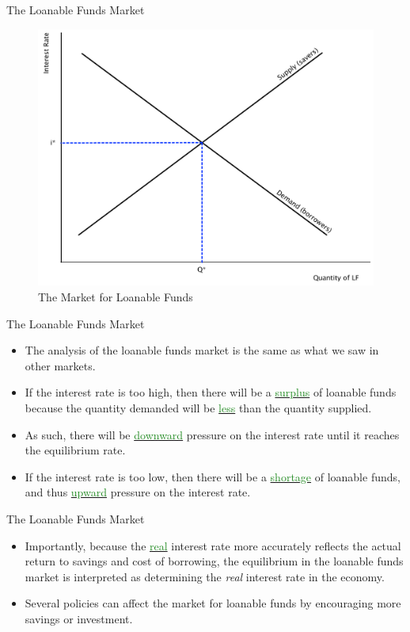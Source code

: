 \documentclass[xcolor={dvipsnames},pdf, hyperref={colorlinks=true, citecolor=ForestGreen, linkcolor=BlueViolet, urlcolor=Magenta}]{beamer}
\theoremstyle{definition}
\newcommand{\dd}[1]{{\underline{\textcolor{ForestGreen}{#1}}}}
\begin{document}
\begin{frame}[b]{The Loanable Funds Market}
	\begin{figure}[H]
	\centering
	\includegraphics[scale=.40]{plot89.pdf}
	\caption{The Market for Loanable Funds}
\end{figure}
\end{frame}

\begin{frame}{The Loanable Funds Market}
\begin{itemize}
	\item The analysis of the loanable funds market is the same as what we saw in other markets. 
	\item If the interest rate is too high, then there will be a \dd{surplus} of loanable funds because the quantity demanded will be \dd{less} than the quantity supplied. 
	\item As such, there will be \dd{downward} pressure on the interest rate until it reaches the equilibrium rate. 
	\item If the interest rate is too low, then there will be a \dd{shortage} of loanable funds, and thus \dd{upward} pressure on the interest rate.
\end{itemize}
\end{frame}

\begin{frame}{The Loanable Funds Market}
\begin{itemize}
	\item Importantly, because the \dd{real} interest rate more accurately reflects the actual return to savings and cost of borrowing, the equilibrium in the loanable funds market is interpreted as determining the \textit{real} interest rate in the economy.
	\item Several policies can affect the market for loanable funds by encouraging more savings or investment. 
\end{itemize}
\end{frame}
\end{document}
